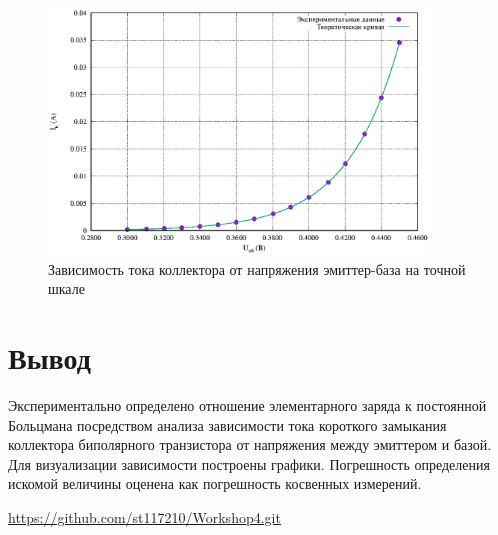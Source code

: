 \begin{figure}[ht!]
\centering
\includegraphics[width=0.9\textwidth]{diode_curve1.eps}
\caption{Зависимость тока коллектора от напряжения эмиттер-база на точной шкале}
\label{fig:plot}
\end{figure}
\clearpage
\section{Вывод}
 Экспериментально определено отношение элементарного заряда к постоянной Больцмана посредством анализа зависимости тока короткого замыкания коллектора биполярного транзистора от напряжения между эмиттером и базой. Для визуализации зависимости построены графики. Погрешность определения искомой величины оценена как погрешность косвенных измерений.
\begin{thebibliography}{9}

\url{https://github.com/st117210/Workshop4.git}  

\end{thebibliography}
\clearpage
\appendix